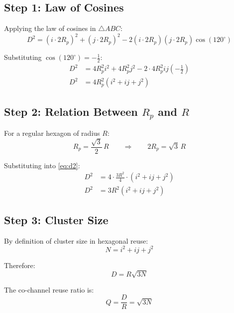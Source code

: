 \documentclass[12pt,a4paper]{report}
\begin{document}
\subsection{Step 1: Law of Cosines}

Applying the law of cosines in $\triangle ABC$:
\begin{equation}
    D^2 = (i \cdot 2R_p)^2 + (j \cdot 2R_p)^2 - 2(i \cdot 2R_p)(j \cdot 2R_p)\cos(120^\circ)
\end{equation}

Substituting $\cos(120^\circ) = -\frac{1}{2}$:
\begin{align}
    D^2 &= 4R_p^2 i^2 + 4R_p^2 j^2 - 2 \cdot 4R_p^2 ij \left(-\frac{1}{2}\right) \\
    D^2 &= 4R_p^2 (i^2 + ij + j^2)
    \label{eq:d2}
\end{align}

\subsection{Step 2: Relation Between $R_p$ and $R$}

For a regular hexagon of radius $R$:
\begin{equation}
    R_p = \frac{\sqrt{3}}{2}\, R \qquad \Longrightarrow \qquad 2R_p = \sqrt{3}\, R
\end{equation}

Substituting into \eqref{eq:d2}:
\begin{align}
    D^2 &= 4 \cdot \frac{3R^2}{4} \cdot (i^2 + ij + j^2) \\
    D^2 &= 3R^2 (i^2 + ij + j^2)
\end{align}

\subsection{Step 3: Cluster Size}

By definition of cluster size in hexagonal reuse:
\begin{equation}
    N = i^2 + ij + j^2
\end{equation}

Therefore:
\begin{equation}
    \boxed{D = R\sqrt{3N}}
\end{equation}

The co-channel reuse ratio is:
\begin{equation}
    Q = \frac{D}{R} = \sqrt{3N}
\end{equation}
\end{document}
